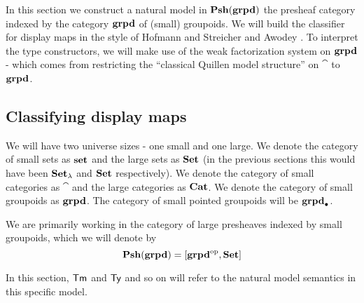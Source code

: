 In this section we construct a natural model in $\mathbf{Psh}(\mathbf{grpd})$ the presheaf category
indexed by the category $\mathbf{grpd}$ of (small) groupoids.
We will build the classifier for display maps in the style of
Hofmann and Streicher \cite{hofmannstreicher1996} and Awodey \cite{awodey2023hofmannstreicheruniverses}.
To interpret the type constructors,
we will make use of the weak factorization system on $\mathbf{grpd}$ -
which comes from restricting the ``classical Quillen model structure'' on
$\cat$ \cite{joyalnlabmodelstructuresoncat} to $\mathbf{grpd}$.

\medskip

\subsection{Classifying display maps}

\medskip

\begin{notation*}
  We will have two universe sizes - one small and one large.
  We denote the category of small sets as $\mathbf{set}$ and the large sets as $\mathbf{Set}$
  (in the previous sections this would have been $\mathbf{Set}_{\lambda}$ and $\mathbf{Set}$ respectively).
  We denote the category of small categories as $\cat$ and the large categories as $\mathbf{Cat}$.
  We denote the category of small groupoids as $\mathbf{grpd}$. %
  The category of small pointed groupoids will be $\mathbf{grpd}_{\bullet}$.

  We are primarily working in the category of large presheaves indexed by small groupoids,
  which we will denote by
  \[ \mathbf{Psh}(\mathbf{grpd}) = [\mathbf{grpd}^{\mathrm{op}}, \mathbf{Set}]\]

  In this section, $\mathsf{Tm}$ and $\mathsf{Ty}$ and so on will refer to the natural model semantics in this
  specific model.
\end{notation*}

\medskip

